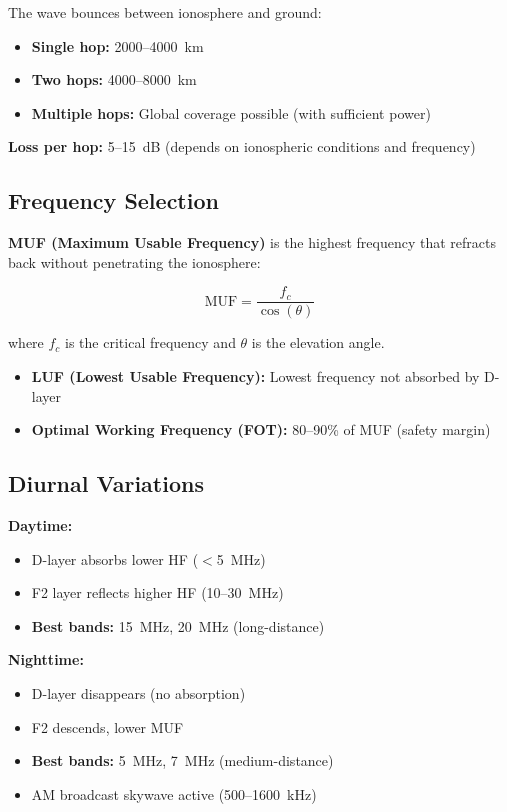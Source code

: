 The wave bounces between ionosphere and ground:

\begin{itemize}
\item \textbf{Single hop:} 2000--4000~km
\item \textbf{Two hops:} 4000--8000~km
\item \textbf{Multiple hops:} Global coverage possible (with sufficient power)
\end{itemize}

\textbf{Loss per hop:} 5--15~dB (depends on ionospheric conditions and frequency)

\subsection{Frequency Selection}

\textbf{MUF (Maximum Usable Frequency)} is the highest frequency that refracts back without penetrating the ionosphere:

\begin{equation}
\label{eq:muf}
\text{MUF} = \frac{f_c}{\cos(\theta)}
\end{equation}

where $f_c$ is the critical frequency and $\theta$ is the elevation angle.

\begin{itemize}
\item \textbf{LUF (Lowest Usable Frequency):} Lowest frequency not absorbed by D-layer
\item \textbf{Optimal Working Frequency (FOT):} 80--90\% of MUF (safety margin)
\end{itemize}

\subsection{Diurnal Variations}

\textbf{Daytime:}
\begin{itemize}
\item D-layer absorbs lower HF ($<$5~MHz)
\item F2 layer reflects higher HF (10--30~MHz)
\item \textbf{Best bands:} 15~MHz, 20~MHz (long-distance)
\end{itemize}

\textbf{Nighttime:}
\begin{itemize}
\item D-layer disappears (no absorption)
\item F2 descends, lower MUF
\item \textbf{Best bands:} 5~MHz, 7~MHz (medium-distance)
\item AM broadcast skywave active (500--1600~kHz)
\end{itemize}

